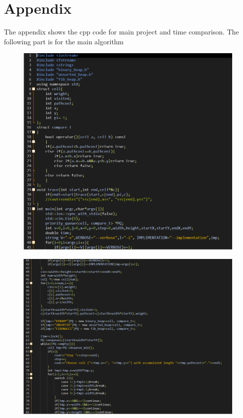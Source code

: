 \documentclass[12pt]{article}
\begin{document}
\section{Appendix}
The appendix shows the cpp code for main project and time comparison.
The following part is for the main algorithm
\begin{figure}[H]
\centering
\includegraphics[scale=0.6]{P4.png}
\end{figure}
\begin{figure}[H]
\centering
\includegraphics[scale=0.6]{P5.png}
\end{figure}
\end{document}
